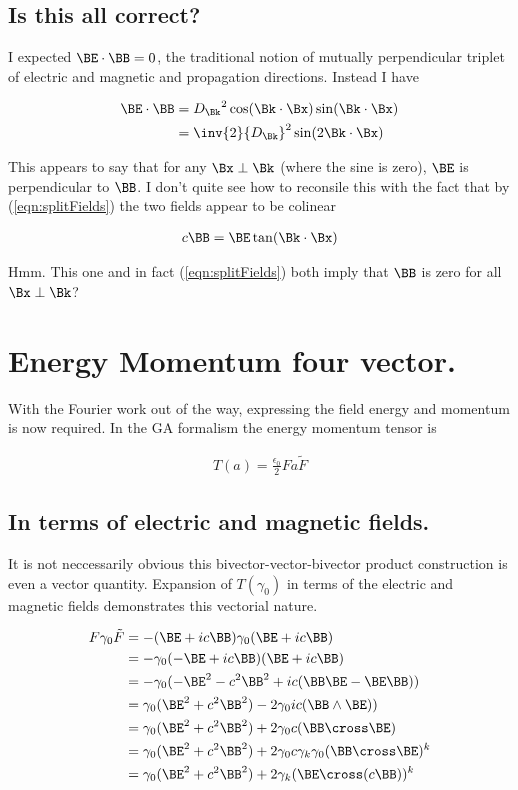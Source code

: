 \documentclass[]{eliblog}
\begin{document}
\subsection{Is this all correct?}

I expected $\BE \cdot \BB = 0$, the traditional notion of mutually perpendicular triplet of electric and magnetic and propagation directions.
Instead I have

\begin{align*}
\BE \cdot \BB 
&= {D_\Bk}^2 \cos(\Bk \cdot \Bx) \sin(\Bk \cdot \Bx) \\
&= \inv{2} {D_\Bk}^2 \sin( 2 \Bk \cdot \Bx) 
\end{align*}

This appears to say that for any $\Bx \perp \Bk$ (where the sine is zero), $\BE$ is perpendicular to $\BB$.  I don't quite see how to reconsile this with the fact that by 
(\ref{eqn:splitFields})
the two fields appear to be colinear

\begin{align*}
c \BB = \BE \tan(\Bk \cdot \Bx)
\end{align*}

Hmm.  This one and in fact (\ref{eqn:splitFields}) both imply that $\BB$ is zero for all $\Bx \perp \Bk$?

\section{Energy Momentum four vector.}

With the Fourier work out of the way, expressing the field energy and momentum is now required.  In the GA
formalism the energy momentum tensor is

\begin{align}
T(a) = \frac{\epsilon_0}{2} F a \tilde{F}
\end{align}

\subsection{ In terms of electric and magnetic fields. }

It is not neccessarily obvious this bivector-vector-bivector product construction is even a vector quantity.
Expansion of $T(\gamma_0)$ in terms of
the electric and magnetic fields
demonstrates this vectorial nature.

\begin{align*}
F \gamma_0 \tilde{F}
&=
-(\BE + i c \BB) \gamma_0 (\BE + i c \BB) \\
&=
-\gamma_0 (-\BE + i c \BB) (\BE + i c \BB) \\
&=
-\gamma_0 (-\BE^2 - c^2 \BB^2 + i c (\BB \BE - \BE \BB) ) \\
&=
\gamma_0 (\BE^2 + c^2 \BB^2) - 2 \gamma_0 i c (\BB \wedge \BE) ) \\
&=
\gamma_0 (\BE^2 + c^2 \BB^2) + 2 \gamma_0 c (\BB \cross \BE) \\
&=
\gamma_0 (\BE^2 + c^2 \BB^2) + 2 \gamma_0 c \gamma_k \gamma_0 (\BB \cross \BE)^k \\
&=
\gamma_0 (\BE^2 + c^2 \BB^2) + 2 \gamma_k (\BE \cross (c \BB))^k \\
\end{align*}
\end{document}
